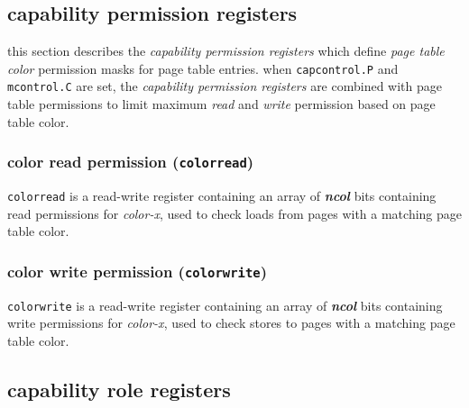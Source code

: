 \newpage
\subsection{capability permission registers}

this section describes the \emph{capability permission registers} which
define \emph{page table color} permission masks for page table entries.
when \texttt{capcontrol.P} and \texttt{mcontrol.C} are set, the
\emph{capability permission registers} are combined with page table
permissions to limit maximum \emph{read} and \emph{write} permission
based on page table color.

\subsubsection{color read permission (\texttt{colorread})}
\texttt{colorread} is a read-write register containing an array
of \textbf{\emph{ncol}} bits containing read permissions for \emph{color-x},
used to check loads from pages with a matching page table color.
\\

\subsubsection{color write permission (\texttt{colorwrite})}
\texttt{colorwrite} is a read-write register containing an array
of \textbf{\emph{ncol}} bits containing write permissions for \emph{color-x},
used to check stores to pages with a matching page table color.
\\

\iffalse
\newpage
\subsection{capability role registers}


